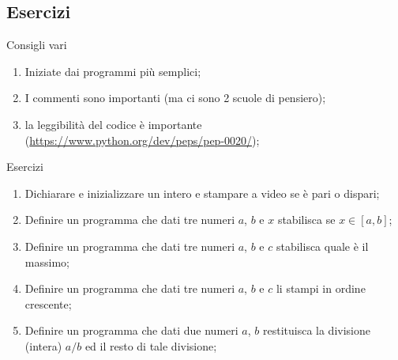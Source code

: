 \subsection[Esercizi]{Esercizi}

\begin{frame}{Consigli vari}
  \begin{enumerate}
    \item Iniziate dai programmi più semplici;
    \item I commenti sono importanti (ma ci sono 2 scuole di pensiero);
    \item la leggibilità del codice è importante (\url{https://www.python.org/dev/peps/pep-0020/});
  \end{enumerate}

\end{frame}

\begin{frame}{Esercizi}
  \begin{enumerate}
   \item Dichiarare e inizializzare un intero e stampare a video se è pari o dispari;
   \item Definire un programma che dati tre numeri $a$, $b$ e $x$ stabilisca se
	 $x \in [a, b]$;
   \item Definire un programma che dati tre numeri $a$, $b$ e $c$ stabilisca quale
	 è il massimo;
   \item Definire un programma che dati tre numeri $a$, $b$ e $c$ li stampi in ordine
	crescente;
   \item Definire un programma che dati due numeri $a$, $b$ restituisca la divisione
	 (intera) $a/b$ ed il resto di tale divisione;
    \end{enumerate}

\end{frame}
